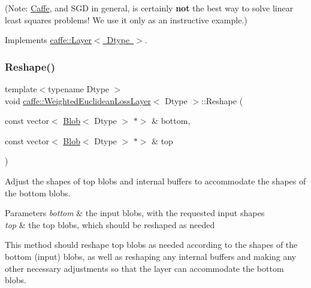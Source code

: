 (Note\+: \mbox{\hyperlink{classcaffe_1_1_caffe}{Caffe}}, and S\+GD in general, is certainly {\bfseries not} the best way to solve linear least squares problems! We use it only as an instructive example.) 

Implements \mbox{\hyperlink{classcaffe_1_1_layer_a576ac6a60b1e99fe383831f52a6cea77}{caffe\+::\+Layer$<$ Dtype $>$}}.

\mbox{\label{classcaffe_1_1_weighted_euclidean_loss_layer_a98e3de49ab49d66b8e3ebfe3aa4fbe20}} 
\subsubsection{\texorpdfstring{Reshape()}{Reshape()}\hspace{0.1cm}{\footnotesize\ttfamily [1/2]}}
{\footnotesize\ttfamily template$<$typename Dtype $>$ \\
void \mbox{\hyperlink{classcaffe_1_1_weighted_euclidean_loss_layer}{caffe\+::\+Weighted\+Euclidean\+Loss\+Layer}}$<$ Dtype $>$\+::Reshape (\begin{DoxyParamCaption}\item[{const vector$<$ \mbox{\hyperlink{classcaffe_1_1_blob}{Blob}}$<$ Dtype $>$ $\ast$$>$ \&}]{bottom,  }\item[{const vector$<$ \mbox{\hyperlink{classcaffe_1_1_blob}{Blob}}$<$ Dtype $>$ $\ast$$>$ \&}]{top }\end{DoxyParamCaption})\hspace{0.3cm}{\ttfamily [virtual]}}



Adjust the shapes of top blobs and internal buffers to accommodate the shapes of the bottom blobs. 


\begin{DoxyParams}{Parameters}
{\em bottom} & the input blobs, with the requested input shapes \\
\hline
{\em top} & the top blobs, which should be reshaped as needed\\
\hline
\end{DoxyParams}
This method should reshape top blobs as needed according to the shapes of the bottom (input) blobs, as well as reshaping any internal buffers and making any other necessary adjustments so that the layer can accommodate the bottom blobs. 

